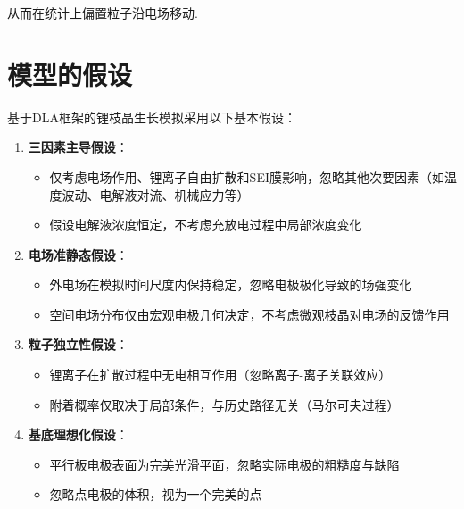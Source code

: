 \documentclass{article}
\begin{document}
		\noindent 从而在统计上偏置粒子沿电场移动. 
\section{模型的假设}
基于DLA框架的锂枝晶生长模拟采用以下基本假设：

\begin{enumerate}
    \item \textbf{三因素主导假设}：
    \begin{itemize}
        \item 仅考虑电场作用、锂离子自由扩散和SEI膜影响，忽略其他次要因素（如温度波动、电解液对流、机械应力等）
        \item 假设电解液浓度恒定，不考虑充放电过程中局部浓度变化
    \end{itemize}


    \item \textbf{电场准静态假设}：
    \begin{itemize}
        \item 外电场在模拟时间尺度内保持稳定，忽略电极极化导致的场强变化
        \item 空间电场分布仅由宏观电极几何决定，不考虑微观枝晶对电场的反馈作用
    \end{itemize}

    \item \textbf{粒子独立性假设}：
    \begin{itemize}
        \item 锂离子在扩散过程中无电相互作用（忽略离子-离子关联效应）
        \item 附着概率仅取决于局部条件，与历史路径无关（马尔可夫过程）
    \end{itemize}

    \item \textbf{基底理想化假设}：
    \begin{itemize}
        \item 平行板电极表面为完美光滑平面，忽略实际电极的粗糙度与缺陷
        \item 忽略点电极的体积，视为一个完美的点

    \end{itemize}
\end{enumerate}
\end{document}

